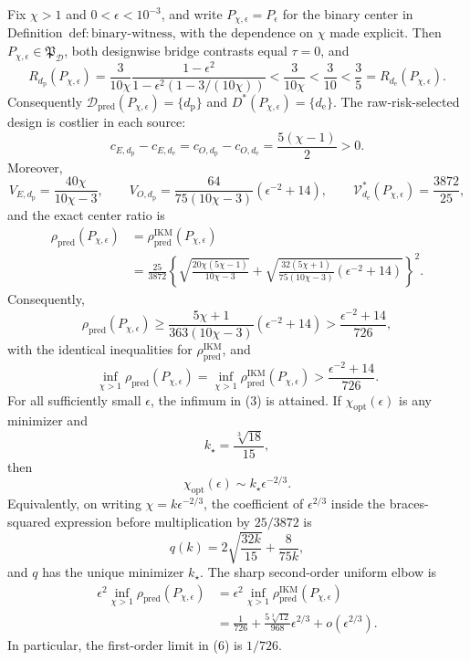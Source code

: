 Fix \(\chi>1\) and \(0<\epsilon<10^{-3}\), and write \(P_{\chi,\epsilon}=P_\epsilon\) for the binary center in Definition~\(\mathrm{def{:}binary\text{-}witness}\), with the dependence on \(\chi\) made explicit. Then \(P_{\chi,\epsilon}\in\mathfrak P_{\mathcal D}\), both designwise bridge contrasts equal \(\tau=0\), and
\[
 R_{d_{\mathrm p}}(P_{\chi,\epsilon})
 =\frac{3}{10\chi}\frac{1-\epsilon^2}{1-\epsilon^2(1-3/(10\chi))}
 <\frac{3}{10\chi}<\frac3{10}<\frac35
 =R_{d_{\mathrm e}}(P_{\chi,\epsilon}).
\]
Consequently \(\mathcal D_{\mathrm{pred}}(P_{\chi,\epsilon})=\{d_{\mathrm p}\}\) and \(D^*(P_{\chi,\epsilon})=\{d_{\mathrm e}\}\). The raw-risk-selected design is costlier in each source:
\[
 c_{E,d_{\mathrm p}}-c_{E,d_{\mathrm e}}
 =c_{O,d_{\mathrm p}}-c_{O,d_{\mathrm e}}
 =\frac{5(\chi-1)}2>0.
\]
Moreover,
\[
 V_{E,d_{\mathrm p}}=\frac{40\chi}{10\chi-3},
 \qquad
 V_{O,d_{\mathrm p}}
 =\frac{64}{75(10\chi-3)}\left(\epsilon^{-2}+14\right),
 \qquad
 \mathcal V_{d_{\mathrm e}}^*(P_{\chi,\epsilon})=\frac{3872}{25},
\]
and the exact center ratio is
\[
\begin{aligned}
 \rho_{\mathrm{pred}}(P_{\chi,\epsilon})
 &=\rho_{\mathrm{pred}}^{\mathrm{IKM}}(P_{\chi,\epsilon})\\
 &=\frac{25}{3872}
 \left\{
 \sqrt{\frac{20\chi(5\chi-1)}{10\chi-3}}
 +\sqrt{\frac{32(5\chi+1)}{75(10\chi-3)}
 \left(\epsilon^{-2}+14\right)}
 \right\}^{2}.                                             \tag{1}
\end{aligned}
\]
Consequently,
\[
 \rho_{\mathrm{pred}}(P_{\chi,\epsilon})
 \ge
 \frac{5\chi+1}{363(10\chi-3)}
 \left(\epsilon^{-2}+14\right)
 >\frac{\epsilon^{-2}+14}{726},                            \tag{2}
\]
with the identical inequalities for \(\rho_{\mathrm{pred}}^{\mathrm{IKM}}\), and
\[
 \inf_{\chi>1}\rho_{\mathrm{pred}}(P_{\chi,\epsilon})
 =\inf_{\chi>1}\rho_{\mathrm{pred}}^{\mathrm{IKM}}(P_{\chi,\epsilon})
 >\frac{\epsilon^{-2}+14}{726}.                            \tag{3}
\]
For all sufficiently small \(\epsilon\), the infimum in (3) is attained. If \(\chi_{\mathrm{opt}}(\epsilon)\) is any minimizer and
\[
 k_\star=\frac{\sqrt[3]{18}}{15},
\]
then
\[
 \chi_{\mathrm{opt}}(\epsilon)
 \sim k_\star\epsilon^{-2/3}.                              \tag{4}
\]
Equivalently, on writing \(\chi=k\epsilon^{-2/3}\), the coefficient of \(\epsilon^{2/3}\) inside the braces-squared expression before multiplication by \(25/3872\) is
\[
 q(k)=2\sqrt{\frac{32k}{15}}+\frac{8}{75k},                \tag{5}
\]
and \(q\) has the unique minimizer \(k_\star\). The sharp second-order uniform elbow is
\[
\begin{aligned}
 \epsilon^2\inf_{\chi>1}\rho_{\mathrm{pred}}(P_{\chi,\epsilon})
 &=\epsilon^2\inf_{\chi>1}\rho_{\mathrm{pred}}^{\mathrm{IKM}}(P_{\chi,\epsilon})\\
 &=\frac1{726}+\frac{5\sqrt[3]{12}}{968}\epsilon^{2/3}
 +o(\epsilon^{2/3}).                                      \tag{6}
\end{aligned}
\]
In particular, the first-order limit in (6) is \(1/726\).